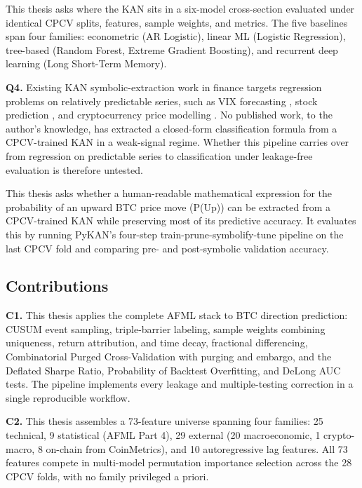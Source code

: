 \documentclass[12pt,a4paper,oneside]{article}
\begin{document}
This thesis asks where the KAN sits in a six-model cross-section evaluated under identical CPCV splits, features, sample weights, and metrics. The five baselines span four families: econometric (AR Logistic), linear ML (Logistic Regression), tree-based (Random Forest, Extreme Gradient Boosting), and recurrent deep learning (Long Short-Term Memory).


\textbf{Q4.} Existing KAN symbolic-extraction work in finance targets regression problems on relatively predictable series, such as VIX forecasting \citep{cho_lee_kim_2025}, stock prediction \citep{oad_kasper_2025}, and cryptocurrency price modelling \citep{gao_decokan_2025}. No published work, to the author's knowledge, has extracted a closed-form classification formula from a CPCV-trained KAN in a weak-signal regime. Whether this pipeline carries over from regression on predictable series to classification under leakage-free evaluation is therefore untested.

This thesis asks whether a human-readable mathematical expression for the probability of an upward BTC price move (P(Up)) can be extracted from a CPCV-trained KAN while preserving most of its predictive accuracy. It evaluates this by running PyKAN's four-step train-prune-symbolify-tune pipeline on the last CPCV fold and comparing pre- and post-symbolic validation accuracy.


\subsection{Contributions}\label{subsec:contributions}


\textbf{C1.} This thesis applies the complete AFML stack to BTC direction prediction: CUSUM event sampling, triple-barrier labeling, sample weights combining uniqueness, return attribution, and time decay, fractional differencing, Combinatorial Purged Cross-Validation with purging and embargo, and the Deflated Sharpe Ratio, Probability of Backtest Overfitting, and DeLong AUC tests. The pipeline implements every leakage and multiple-testing correction in a single reproducible workflow.


\textbf{C2.} This thesis assembles a 73-feature universe spanning four families: 25 technical, 9 statistical (AFML Part 4), 29 external (20 macroeconomic, 1 crypto-macro, 8 on-chain from CoinMetrics), and 10 autoregressive lag features. All 73 features compete in multi-model permutation importance selection across the 28 CPCV folds, with no family privileged a priori.
\end{document}
